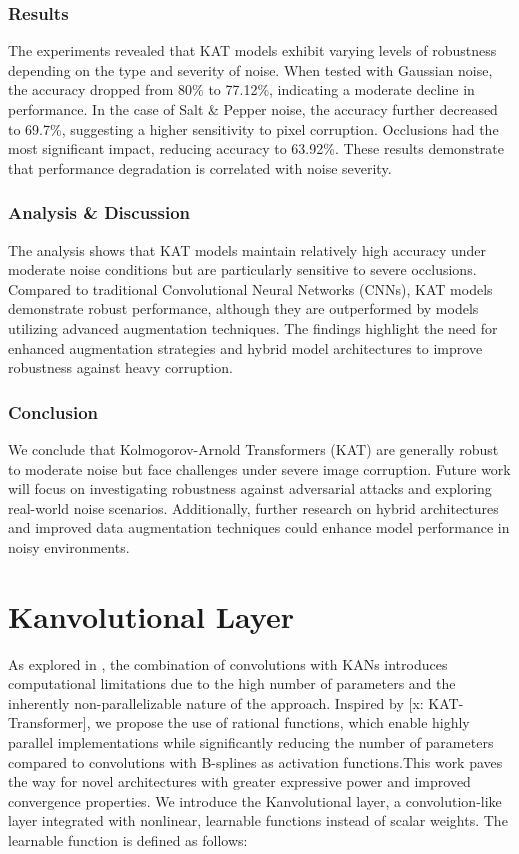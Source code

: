 \documentclass[conference]{IEEEtran}
\begin{document}
\subsubsection{Results}

The experiments revealed that KAT models exhibit varying levels of robustness
depending on the type and severity of noise. When tested with Gaussian noise,
the accuracy dropped from 80\% to 77.12\%, indicating a moderate decline in
performance. In the case of Salt \& Pepper noise, the accuracy further
decreased to 69.7\%, suggesting a higher sensitivity to pixel corruption.
Occlusions had the most significant impact, reducing accuracy to 63.92\%. These
results demonstrate that performance degradation is correlated with noise
severity.

\subsubsection{Analysis \& Discussion}

The analysis shows that KAT models maintain relatively high accuracy under
moderate noise conditions but are particularly sensitive to severe occlusions.
Compared to traditional Convolutional Neural Networks (CNNs), KAT models
demonstrate robust performance, although they are outperformed by models
utilizing advanced augmentation techniques. The findings highlight the need for
enhanced augmentation strategies and hybrid model architectures to improve
robustness against heavy corruption.

\subsubsection{Conclusion}

We conclude that Kolmogorov-Arnold Transformers (KAT) are generally robust to
moderate noise but face challenges under severe image corruption. Future work
will focus on investigating robustness against adversarial attacks and
exploring real-world noise scenarios. Additionally, further research on hybrid
architectures and improved data augmentation techniques could enhance model
performance in noisy environments.

\section{Kanvolutional Layer}

As explored in \cite{CNN-KAN}, the combination of convolutions with KANs
introduces computational limitations due to the high number of parameters and
the inherently non-parallelizable nature of the approach. Inspired by [x:
        KAT-Transformer], we propose the use of rational functions, which enable highly
parallel implementations while significantly reducing the number of parameters
compared to convolutions with B-splines as activation functions.This work paves
the way for novel architectures with greater expressive power and improved
convergence properties. We introduce the Kanvolutional layer, a
convolution-like layer integrated with nonlinear, learnable functions instead
of scalar weights. The learnable function is defined as follows:
\end{document}
